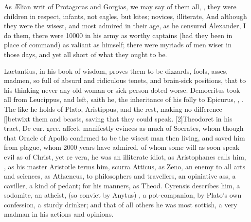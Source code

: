 {As \AE{}lian writ of Protagoras and Gorgias, we may say of them all,
, they were
children in respect, infants, not eagles, but kites; novices,
illiterate,  And although they were the wisest, and
most admired in their age, as he censured Alexander, I do them, there
were 10\thinspace{}000 in his army as worthy captains (had they been in place of
command) as valiant as himself; there were myriads of men wiser in
those days, and yet all short of what they ought to be.

Lactantius, in his book of wisdom, proves them to be dizzards,
fools, asses, madmen, so full of absurd and ridiculous tenets, and
brain-sick positions, that to his thinking never any old woman or sick
person doted worse. Democritus took all from Leucippus, and left,
saith he, the inheritance of his folly to Epicurus, , \etc. The like he holds of Plato, Aristippus, and the rest,
making no difference [\baselineskip]betwixt them and beasts, saving that they
could speak. [2\baselineskip]Theodoret in his tract, De cur. grec. affect.
manifestly evinces as much of Socrates, whom though that Oracle of
Apollo confirmed to be the wisest man then living, and saved him from
plague, whom 2000 years have admired, of whom some will as soon speak
evil as of Christ, yet re vera, he was an illiterate idiot, as
Aristophanes calls him, , as his master
Aristotle terms him, scurra Atticus, as Zeno, an enemy to all arts
and sciences, as Ath\ae{}neus, to philosophers and travellers, an
opiniative ass, a caviller, a kind of pedant; for his manners, as
Theod. Cyrensis describes him, a  sodomite, an atheist, (so
convict by Anytus) , \etc a pot-companion, by
Plato's own confession, a sturdy drinker; and that of all others
he was most sottish, a very madman in his actions and opinions.

}
